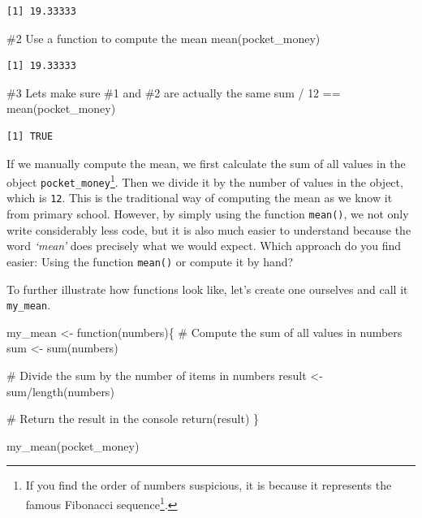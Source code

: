 \documentclass[
  letterpaper,
]{krantz}
\makeatletter
\newenvironment{Shaded}{\begin{snugshade}}{\end{snugshade}}
\newcommand{\CommentTok}[1]{\textcolor[rgb]{0.37,0.37,0.37}{#1}}
\newcommand{\ControlFlowTok}[1]{\textcolor[rgb]{0.00,0.23,0.31}{#1}}
\newcommand{\DecValTok}[1]{\textcolor[rgb]{0.68,0.00,0.00}{#1}}
\newcommand{\FunctionTok}[1]{\textcolor[rgb]{0.28,0.35,0.67}{#1}}
\newcommand{\NormalTok}[1]{\textcolor[rgb]{0.00,0.23,0.31}{#1}}
\newcommand{\OtherTok}[1]{\textcolor[rgb]{0.00,0.23,0.31}{#1}}
\newcommand{\SpecialCharTok}[1]{\textcolor[rgb]{0.37,0.37,0.37}{#1}}
\renewcommand{\href}[2]{#2\footnote{\url{#1}}}
\newenvironment{kframe}{%
\medskip{}
\setlength{\fboxsep}{.8em}
 \def\at@end@of@kframe{}%
 \ifinner\ifhmode%
  \def\at@end@of@kframe{\end{minipage}}%
  \begin{minipage}{\columnwidth}%
 \fi\fi%
 \def\FrameCommand##1{\hskip\@totalleftmargin \hskip-\fboxsep
 \colorbox{shadecolor}{##1}\hskip-\fboxsep
     \hskip-\linewidth \hskip-\@totalleftmargin \hskip\columnwidth}%
 \MakeFramed {\advance\hsize-\width
   \@totalleftmargin\z@ \linewidth\hsize
   \@setminipage}}%
 {\par\unskip\endMakeFramed%
 \at@end@of@kframe}
\renewenvironment{Shaded}{\begin{kframe}}{\end{kframe}}
\makeatother
\begin{document}
\begin{verbatim}
[1] 19.33333
\end{verbatim}

\begin{Shaded}
\begin{Highlighting}[]
\CommentTok{\#2 Use a function to compute the mean}
\FunctionTok{mean}\NormalTok{(pocket\_money)}
\end{Highlighting}
\end{Shaded}

\begin{verbatim}
[1] 19.33333
\end{verbatim}

\begin{Shaded}
\begin{Highlighting}[]
\CommentTok{\#3 Let\textquotesingle{}s make sure \#1 and \#2 are actually the same}
\NormalTok{sum }\SpecialCharTok{/} \DecValTok{12} \SpecialCharTok{==} \FunctionTok{mean}\NormalTok{(pocket\_money)}
\end{Highlighting}
\end{Shaded}

\begin{verbatim}
[1] TRUE
\end{verbatim}

If we manually compute the mean, we first calculate the sum of all
values in the object \texttt{pocket\_money}\footnote{If you find the
  order of numbers suspicious, it is because it represents the famous
  \href{https://en.wikipedia.org/wiki/Fibonacci_number}{Fibonacci
  sequence}.}. Then we divide it by the number of values in the object,
which is \texttt{12}. This is the traditional way of computing the mean
as we know it from primary school. However, by simply using the function
\texttt{mean()}, we not only write considerably less code, but it is
also much easier to understand because the word \emph{`mean'} does
precisely what we would expect. Which approach do you find easier: Using
the function \texttt{mean()} or compute it by hand?

To further illustrate how functions look like, let's create one
ourselves and call it \texttt{my\_mean}.

\begin{Shaded}
\begin{Highlighting}[]
\NormalTok{my\_mean }\OtherTok{\textless{}{-}} \ControlFlowTok{function}\NormalTok{(numbers)\{}
  \CommentTok{\# Compute the sum of all values in \textquotesingle{}numbers\textquotesingle{}}
\NormalTok{  sum }\OtherTok{\textless{}{-}} \FunctionTok{sum}\NormalTok{(numbers)}
  
  \CommentTok{\# Divide the sum by the number of items in \textquotesingle{}numbers\textquotesingle{}}
\NormalTok{  result }\OtherTok{\textless{}{-}}\NormalTok{ sum}\SpecialCharTok{/}\FunctionTok{length}\NormalTok{(numbers)}
  
  \CommentTok{\# Return the result in the console}
  \FunctionTok{return}\NormalTok{(result)}
\NormalTok{\}}

\FunctionTok{my\_mean}\NormalTok{(pocket\_money)}
\end{Highlighting}
\end{Shaded}
\end{document}
